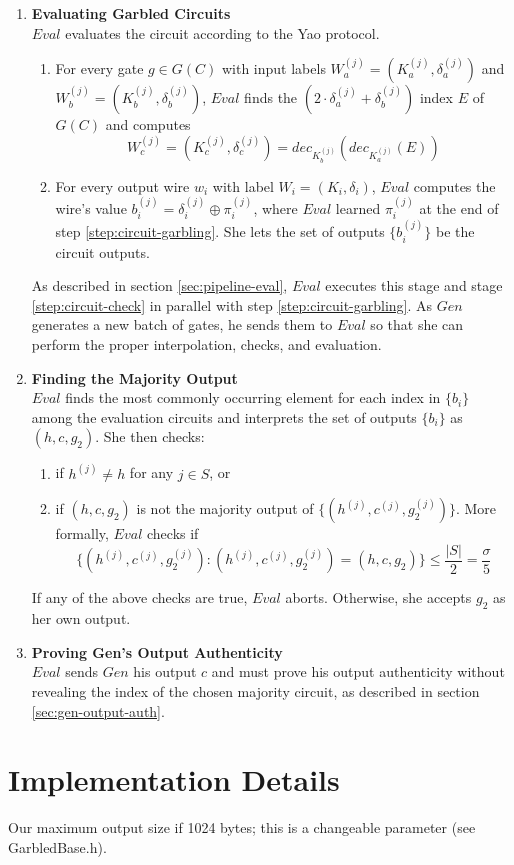 \documentclass{article}
\begin{document}
\begin{enumerate}
	\item \label{step:circuit-evaluate} \textbf{Evaluating Garbled Circuits}\\
	$Eval$ evaluates the circuit according to the Yao protocol. 
	\begin{enumerate}[label=(\alph*)]
		\item For every gate $g \in G(C)$ with input labels $W_{a}^{(j)} = (K_{a}^{(j)}, \delta_{a}^{(j)})$ and $W_{b}^{(j)} = (K_{b}^{(j)}, \delta_{b}^{(j)})$, $Eval$ finds the $(2 \cdot \delta_{a}^{(j)} + \delta_{b}^{(j)})$ index $E$ of $G(C)$ and computes $$W_{c}^{(j)} = (K_{c}^{(j)}, \delta_{c}^{(j)}) = dec_{K_{b}^{(j)}}(dec_{K_{a}^{(j)}}(E))$$
		\item For every output wire $w_{i}$ with label $W_{i} = (K_{i},\delta_{i})$, $Eval$ computes the wire's value $b_{i}^{(j)} = \delta_{i}^{(j)} \oplus \pi_{i}^{(j)}$, where $Eval$ learned $\pi_{i}^{(j)}$ at the end of step \ref{step:circuit-garbling}. She lets the set of outputs $\{b_{i}^{(j)}\}$ be the circuit outputs.
	\end{enumerate}
	
	As described in section \ref{sec:pipeline-eval}, $Eval$ executes this stage and stage \ref{step:circuit-check} in parallel with step \ref{step:circuit-garbling}. As $Gen$ generates a new batch of gates, he sends them to $Eval$ so that she can perform the proper interpolation, checks, and evaluation.
	
	\item \label{step:majority} \textbf{Finding the Majority Output}\\
	$Eval$ finds the most commonly occurring element for each index in $\{b_{i}\}$ among the evaluation circuits and interprets the set of outputs $\{ b_{i} \}$ as $(h,c,g_{2})$. She then checks:
	\begin{enumerate}[label=(\alph*)]
		\item if $h^{(j)} \neq h$ for any $j \in S$, or
		\item if $(h,c,g_{2})$ is not the majority output of $\{ (h^{(j)},c^{(j)},g_{2}^{(j)}) \}$. More formally, $Eval$ checks if
		$$ \big\{ (h^{(j)},c^{(j)}, g_{2}^{(j)}) : (h^{(j)}, c^{(j)}, g_{2}^{(j)}) =(h,c,g_{2}) \big\} \leq \frac{|S|}{2} = \frac{\sigma}{5}$$
	\end{enumerate}
	If any of the above checks are true, $Eval$ aborts. Otherwise, she accepts $g_{2}$ as her own output.
	
	\item \label{step:gen-out-auth} \textbf{Proving Gen's Output Authenticity}\\
	$Eval$ sends $Gen$ his output $c$ and must prove his output authenticity without revealing the index of the chosen majority circuit, as described in section \ref{sec:gen-output-auth}.
	
\end{enumerate}

\section{Implementation Details}\label{sec:implementation}

Our maximum output size if 1024 bytes; this is a changeable parameter (see GarbledBase.h).





\end{document}
